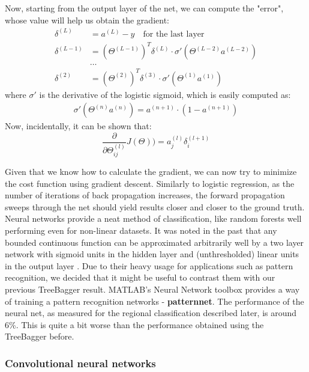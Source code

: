 \documentclass[a4paper, 11pt]{article}
\numberwithin{equation}{section}
\begin{document}
		\noindent Now, starting from the output layer of the net, we can compute the "error", whose value will help us obtain the gradient:
		\begin{align}
		\delta^{(L)} &= a^{(L)} - y \quad \textrm{for the last layer} \\
		\delta^{(L-1)} &= (\Theta ^ {(L-1)})^T \delta^{(L)} \cdot \sigma'(\Theta^{(L-2)} a^{(L-2)}) \\
		&\ldots \\
		\delta^{(2)} &= (\Theta ^ {(2)})^T \delta^{(3)} \cdot \sigma'(\Theta^{(1)} a^{(1)})
		\end{align}
		where $\sigma'$ is the derivative of the logistic sigmoid, which is easily computed as:
		\begin{align}
		\sigma'(\Theta^{(n)} a^{(n)}) = a^{(n+1)} \cdot (1-a^{(n+1)})
		\end{align}
		Now, incidentally, it can be shown that:
		\begin{equation}
		\frac{\partial}{\partial \Theta_{ij}^{(l)}} J(\Theta)) = a_j^{(l)} \delta_i^{(l+1)}
		\end{equation}
		
		\noindent Given that we know how to calculate the gradient, we can now try to minimize the cost function using gradient descent. Similarly to logistic regression, as the number of iterations of back propagation increases, the forward propagation sweeps through the net should yield results closer and closer to the ground truth. \\
		
		\noindent Neural networks provide a neat method of classification, like random forests well performing even for non-linear datasets. It was noted in the past that any bounded continuous function can be approximated arbitrarily well by a two layer network with sigmoid units in the hidden layer and (unthresholded) linear units in the output layer \cite{cybenko1989approximation}. Due to their heavy usage for applications such as pattern recognition, we decided that it might be useful to contrast them with our previous TreeBagger result. MATLAB's Neural Network toolbox provides a way of training a pattern recognition networks - \textbf{patternnet}. The performance of the neural net, as measured for the regional classification described later, is around 6\%. This is quite a bit worse than the performance obtained using the TreeBagger before.
		
		\subsubsection{Convolutional neural networks}
		
\end{document}
